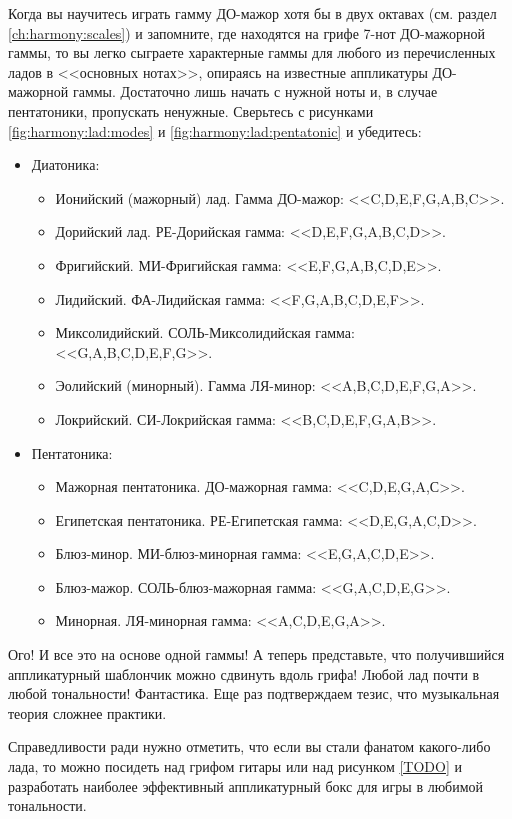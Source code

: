 Когда вы научитесь играть гамму ДО-мажор хотя бы в двух октавах (см. раздел \ref{ch:harmony:scales}) и запомните, где находятся на грифе 7-нот ДО-мажорной гаммы, то вы легко сыграете характерные гаммы для любого из перечисленных ладов в <<основных нотах>>, опираясь на известные аппликатуры ДО-мажорной гаммы. Достаточно лишь начать с нужной ноты и, в случае пентатоники, пропускать ненужные. Сверьтесь с рисунками \ref{fig:harmony:lad:modes} и \ref{fig:harmony:lad:pentatonic} и убедитесь:
\begin{itemize}
    \item Диатоника:
    \begin{itemize}
        \item Ионийский (мажорный) лад. Гамма ДО-мажор: <<C,D,E,F,G,A,B,C>>.
        \item Дорийский лад. РЕ-Дорийская гамма: <<D,E,F,G,A,B,C,D>>.
        \item Фригийский. МИ-Фригийская гамма: <<E,F,G,A,B,C,D,E>>.
        \item Лидийский. ФА-Лидийская гамма: <<F,G,A,B,C,D,E,F>>.
        \item Миксолидийский. СОЛЬ-Миксолидийская гамма: <<G,A,B,C,D,E,F,G>>.
        \item Эолийский (минорный). Гамма ЛЯ-минор: <<A,B,C,D,E,F,G,A>>.
        \item Локрийский. СИ-Локрийская гамма: <<B,C,D,E,F,G,A,B>>.
    \end{itemize}

    \item Пентатоника:
    \begin{itemize}
        \item Мажорная пентатоника. ДО-мажорная гамма: <<C,D,E,G,A,С>>.
        \item Египетская пентатоника. РЕ-Египетская гамма: <<D,E,G,A,C,D>>.
        \item Блюз-минор. МИ-блюз-минорная гамма: <<E,G,A,C,D,E>>.
        \item Блюз-мажор. СОЛЬ-блюз-мажорная гамма: <<G,A,C,D,E,G>>.
        \item Минорная. ЛЯ-минорная гамма: <<A,C,D,E,G,A>>.
    \end{itemize}
\end{itemize}

Ого! И все это на основе одной гаммы! А теперь представьте, что получившийся аппликатурный шаблончик можно сдвинуть вдоль грифа! Любой лад почти в любой тональности! Фантастика. Еще раз подтверждаем тезис, что музыкальная теория сложнее практики.

Справедливости ради нужно отметить, что если вы стали фанатом какого-либо лада, то можно посидеть над грифом гитары или над рисунком \ref{TODO} и разработать наиболее эффективный аппликатурный бокс для игры в любимой тональности.



